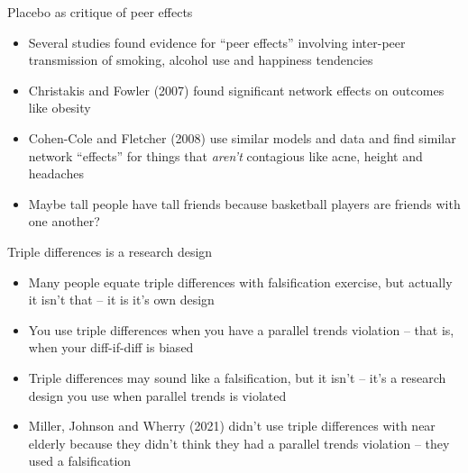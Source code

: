 \documentclass{beamer}
\begin{document}
\begin{frame}{Placebo as critique of peer effects}

\begin{itemize}
	\item Several studies found evidence for ``peer effects'' involving inter-peer transmission of smoking, alcohol use and happiness tendencies
	\item Christakis and Fowler (2007) found significant network effects on outcomes like obesity
	\item Cohen-Cole and Fletcher (2008) use similar models and data and find similar network ``effects'' for things that \emph{aren't} contagious like acne, height and headaches
	\item Maybe tall people have tall friends because basketball players are friends with one another?
\end{itemize}

\end{frame}


\begin{frame}{Triple differences is a research design}

\begin{itemize}

\item Many people equate triple differences with falsification exercise, but actually it isn't that -- it is it's own design
\item You use triple differences when you have a parallel trends violation -- that is, when your diff-if-diff is biased
\item Triple differences may sound like a falsification, but it isn't -- it's a research design you use when parallel trends is violated
\item Miller, Johnson and Wherry (2021) didn't use triple differences with near elderly because they didn't think they had a parallel trends violation -- they used a falsification
\end{itemize}

\end{frame}
\end{document}
